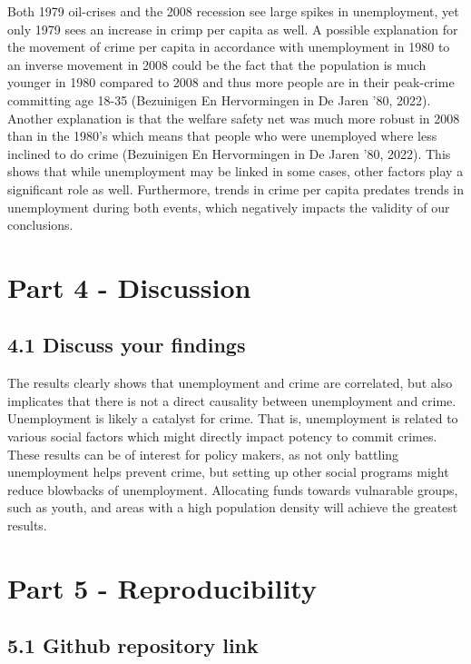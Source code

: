 \documentclass[
]{article}
\begin{document}
Both 1979 oil-crises and the 2008 recession see large spikes in
unemployment, yet only 1979 sees an increase in crimp per capita as
well. A possible explanation for the movement of crime per capita in
accordance with unemployment in 1980 to an inverse movement in 2008
could be the fact that the population is much younger in 1980 compared
to 2008 and thus more people are in their peak-crime committing age
18-35 (Bezuinigen En Hervormingen in De Jaren '80, 2022). Another
explanation is that the welfare safety net was much more robust in 2008
than in the 1980's which means that people who were unemployed where
less inclined to do crime (Bezuinigen En Hervormingen in De Jaren '80,
2022). This shows that while unemployment may be linked in some cases,
other factors play a significant role as well. Furthermore, trends in
crime per capita predates trends in unemployment during both events,
which negatively impacts the validity of our conclusions.

\section{Part 4 - Discussion}\label{part-4---discussion}

\subsection{4.1 Discuss your findings}\label{discuss-your-findings}

The results clearly shows that unemployment and crime are correlated,
but also implicates that there is not a direct causality between
unemployment and crime. Unemployment is likely a catalyst for crime.
That is, unemployment is related to various social factors which might
directly impact potency to commit crimes. These results can be of
interest for policy makers, as not only battling unemployment helps
prevent crime, but setting up other social programs might reduce
blowbacks of unemployment. Allocating funds towards vulnarable groups,
such as youth, and areas with a high population density will achieve the
greatest results.

\section{Part 5 - Reproducibility}\label{part-5---reproducibility}

\subsection{5.1 Github repository link}\label{github-repository-link}
\end{document}
